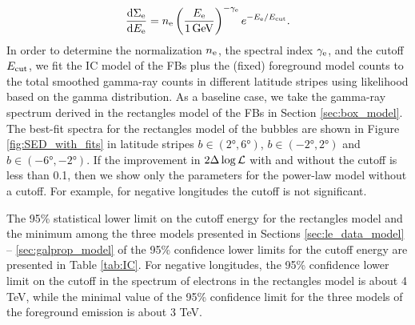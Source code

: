 \begin{equation} 
\label{eq:e_spectrum}
 \frac{\text{d} \Sigma_{\text{e}}}{\text{d} E_{\text{e}}} = n_{\text{e}} \left(\frac{E_{\text{e}}}{\SI{1}{GeV}}\right)^{-\gamma_{\text{e}}} e^{- E_{\text{e}} / E_{\text{cut}}}.
\end{equation}
In order to determine the normalization $n_{\text{e}}$, the spectral index $\gamma_{\text{e}}$, and the cutoff  $E_{\text{cut}}$, 
we fit the IC model of the FBs plus the (fixed) foreground model counts to the 
total smoothed gamma-ray counts in different latitude stripes using likelihood based on the gamma distribution.
As a baseline case, we take the gamma-ray spectrum derived in the rectangles model of the FBs in Section \ref{sec:box_model}.
The best-fit spectra for the rectangles model of the bubbles are shown in Figure \ref{fig:SED_with_fits}
in latitude stripes $b \in (\ang{2}, \ang{6})$, $b \in (-\ang{2}, \ang{2})$ and $b \in (-\ang{6}, -\ang{2})$. 
If the improvement in $2 \Delta \log {\mathcal{L}}$ with and without the cutoff is less than 0.1, then we show only the parameters for the power-law model without a cutoff.
For example, for negative longitudes the cutoff is not significant.

The 95\% statistical lower limit on the cutoff energy for the rectangles model and the minimum 
among the three models presented in Sections \ref{sec:le_data_model} -- \ref{sec:galprop_model}
of the 95\% confidence lower limits 
for the cutoff energy are presented in Table \ref{tab:IC}.
For negative longitudes,
the 95\% confidence lower limit on the cutoff in the spectrum of electrons in the rectangles model is about 4 TeV,
while the minimal value of the 95\% confidence limit for the three models of the foreground emission is about 3 TeV.


